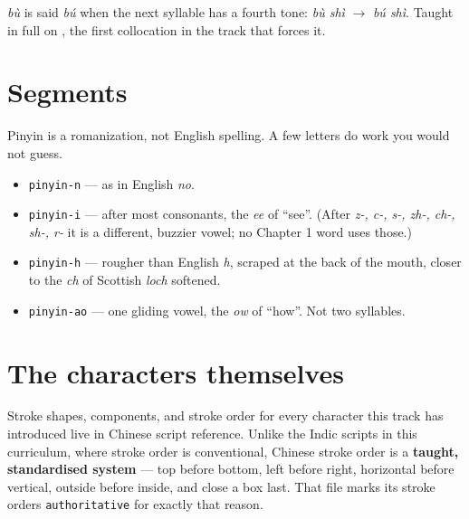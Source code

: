  \emph{bù} is said \emph{bú} when the next syllable has a fourth tone: \emph{bù shì} $\to$ \emph{bú shì}. Taught in full on , the first collocation in the track that forces it.

\section*{Segments}

Pinyin is a romanization, not English spelling. A few letters do work you would not guess.

\begin{itemize}
\raggedright
\setlength{\itemsep}{0.35em}
  \item \texttt{pinyin-n} — as in English \emph{no}.
  \item \texttt{pinyin-i} — after most consonants, the \emph{ee} of \textquotedblleft{}see\textquotedblright{}. (After \emph{z-, c-, s-, zh-, ch-, sh-, r-} it is a different, buzzier vowel; no Chapter 1 word uses those.)
  \item \texttt{pinyin-h} — rougher than English \emph{h}, scraped at the back of the mouth, closer to the \emph{ch} of Scottish \emph{loch} softened.
  \item \texttt{pinyin-ao} — one gliding vowel, the \emph{ow} of \textquotedblleft{}how\textquotedblright{}. Not two syllables.
\end{itemize}

\section*{The characters themselves}

Stroke shapes, components, and stroke order for every character this track has introduced live in Chinese script reference. Unlike the Indic scripts in this curriculum, where stroke order is conventional, Chinese stroke order is a \textbf{taught, standardised system} — top before bottom, left before right, horizontal before vertical, outside before inside, and close a box last. That file marks its stroke orders \texttt{authoritative} for exactly that reason.
